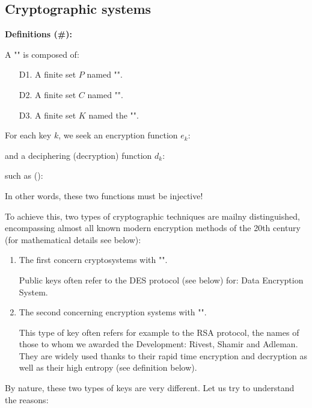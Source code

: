 	\subsection{Cryptographic systems}
	
	\textbf{Definitions (\#\mydef):}
	
	A "" is composed of:
	\begin{enumerate}
		\item[D1.] A finite set $P$ named "".
		
		\item[D2.] A finite set $C$ named "".
		
		\item[D3.] A finite set $K$ named  the "".
	\end{enumerate}
	For each key $k$, we seek an encryption function $e_k$:
	
	and a deciphering (decryption) function $d_k$:
	
	such as ():
	
	In other words, these two functions must be injective!
	
	To achieve this, two types of cryptographic techniques are mailny distinguished, encompassing almost all known modern encryption methods of the 20th century (for mathematical details see below):
	\begin{enumerate}
		\item The first concern cryptosystems with "".
		\begin{tcolorbox}[title=Remark,colframe=black,arc=10pt]
		Public keys often refer to the DES protocol (see below) for: Data Encryption System.
		\end{tcolorbox}
		
		\item The second concerning encryption systems with "".
		\begin{tcolorbox}[title=Remark,colframe=black,arc=10pt]
		This type of key often refers for example to the RSA protocol, the names of those to whom we awarded the Development: Rivest, Shamir and Adleman. They are widely used thanks to their rapid time encryption and decryption as well as their high entropy (see definition below).
		\end{tcolorbox}
	\end{enumerate}
	By nature, these two types of keys are very different. Let us try to understand the reasons:
		

